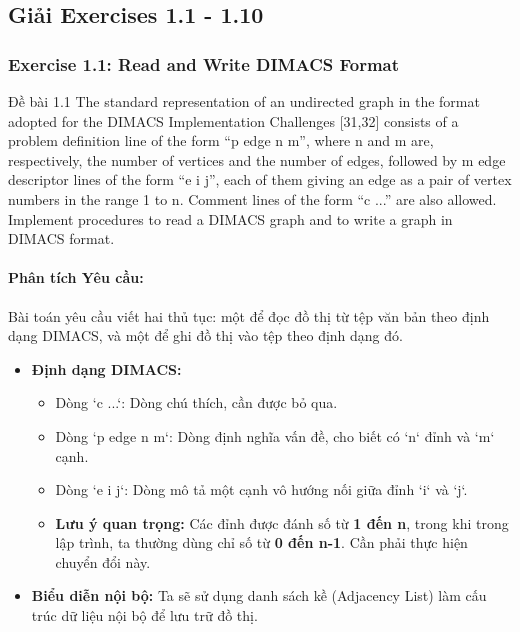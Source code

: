 \documentclass[a4paper,12pt]{article}
\begin{document}
\subsection{Giải Exercises 1.1 - 1.10}

\subsubsection{Exercise 1.1: Read and Write DIMACS Format}
\begin{problembox}{Đề bài 1.1}
    The standard representation of an undirected graph in the format adopted for the DIMACS Implementation Challenges [31,32] consists of a problem definition line of the form ``p edge n m'', where n and m are, respectively, the number of vertices and the number of edges, followed by m edge descriptor lines of the form ``e i j'', each of them giving an edge as a pair of vertex numbers in the range 1 to n. Comment lines of the form ``c ...'' are also allowed. Implement procedures to read a DIMACS graph and to write a graph in DIMACS format.
\end{problembox}

\paragraph{Phân tích Yêu cầu:}
Bài toán yêu cầu viết hai thủ tục: một để đọc đồ thị từ tệp văn bản theo định dạng DIMACS, và một để ghi đồ thị vào tệp theo định dạng đó.
\begin{itemize}
    \item \textbf{Định dạng DIMACS:}
        \begin{itemize}
            \item Dòng `c ...`: Dòng chú thích, cần được bỏ qua.
            \item Dòng `p edge n m`: Dòng định nghĩa vấn đề, cho biết có `n` đỉnh và `m` cạnh.
            \item Dòng `e i j`: Dòng mô tả một cạnh vô hướng nối giữa đỉnh `i` và `j`.
            \item \textbf{Lưu ý quan trọng:} Các đỉnh được đánh số từ \textbf{1 đến n}, trong khi trong lập trình, ta thường dùng chỉ số từ \textbf{0 đến n-1}. Cần phải thực hiện chuyển đổi này.
        \end{itemize}
    \item \textbf{Biểu diễn nội bộ:} Ta sẽ sử dụng danh sách kề (Adjacency List) làm cấu trúc dữ liệu nội bộ để lưu trữ đồ thị.
\end{itemize}
\end{document}
